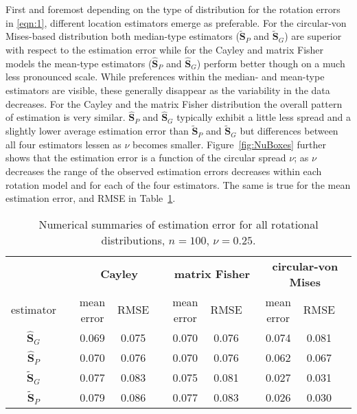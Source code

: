 First and foremost depending on the type of distribution for the rotation errors in \eqref{eqn:1}, different location estimators emerge as preferable.  For the circular-von Mises-based distribution both median-type estimators ($\widetilde{\bm S}_P$ and $\widetilde{\bm S}_{G}$) are superior with respect to the estimation error while for the Cayley and matrix Fisher models the mean-type estimators ($\widehat{\bm S}_P$ and $\widehat{\bm S}_{G}$) perform better though on a much less pronounced scale. While preferences within the median- and mean-type estimators are visible, these generally disappear as the variability in the data decreases.    
For the Cayley and the matrix Fisher distribution the overall pattern of estimation is very similar. $\widehat{\bm S}_P$ and $\widehat{\bm S}_{G}$ typically exhibit a little less spread and a slightly lower average estimation error than $\widetilde{\bm S}_P$ and $\widetilde{\bm S}_{G}$ but differences between all four estimators lessen as $\nu$ becomes smaller. Figure~\ref{fig:NuBoxes} further shows that the estimation error is a function of the circular spread $\nu$; as $\nu$ decreases the range of the observed estimation errors decreases within each rotation model and for each of the four estimators. The same is true for the mean estimation error, and RMSE in Table~\ref{tab:alldN100Nu25}.  

 \begin{table}[h!]
 \caption{Numerical summaries of estimation error for all rotational distributions, $n=100$,  $\nu=0.25$.  \label{tab:alldN100Nu25}}
\begin{center}
\begin{tabular}{ccccccccccc}
  \hline
		& &\multicolumn{3}{c}{\textbf{Cayley}} & \multicolumn{3}{c}{\textbf{matrix Fisher}}  & \multicolumn{3}{c}{\textbf{circular-von Mises}}\\ 
estimator 	& &  mean error & RMSE& &  mean error & RMSE& &   mean error & RMSE \\  \hline \hline %
 		  $\widehat{\bm S}_{G}$ & &  0.069 & 0.075 & &  0.070 & 0.076&  & 0.074 & 0.081 \\ 
 		 $\widehat{\bm S}_{P}$ &  & 0.070 & 0.076 & &  0.070 & 0.076&  &  0.062 & 0.067\\ 
		 $\widetilde{\bm S}_{G}$ &  & 0.077 & 0.083 & &  0.075 & 0.081&  & 0.027 & 0.031\\ 
 		  $\widetilde{\bm S}_{P}$ &  & 0.079 & 0.086 & &  0.077 & 0.083 & & 0.026 & 0.030\\ \hline
\end{tabular}
\end{center}
\end{table}



